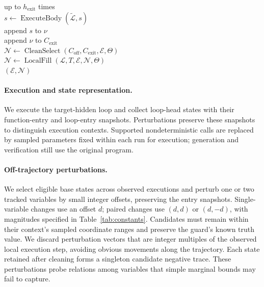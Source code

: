 \begin{algorithm}[H]
\begin{algorithmic}
\algline \algind {} up to \(h_{\mathrm{exit}}\) times\\
\algline \algind \algind \(s\leftarrow\operatorname{ExecuteBody}(\widetilde{\mathcal L},s)\)
  \\
\algline \algind \algind append \(s\) to \(\nu\)\\
\algline \algind append \(\nu\) to \(C_{\mathrm{exit}}\)
  \\
\algline \(\mathcal N\leftarrow\operatorname{CleanSelect}(C_{\mathrm{off}},C_{\mathrm{exit}},\mathcal E,\Theta)\)\\
\algline \(\mathcal N\leftarrow\operatorname{LocalFill}(\mathcal L,T,\mathcal E,\mathcal N,\Theta)\)
  \\
\algline {} \((\mathcal E,\mathcal N)\)
\end{algorithmic}
\end{algorithm}

\paragraph{Execution and state representation.}
We execute the target-hidden loop and collect loop-head states with their
function-entry and loop-entry snapshots.  Perturbations preserve these
snapshots to distinguish execution contexts.  Supported nondeterministic
calls are replaced by sampled parameters fixed within each run for execution;
generation and verification still use the original program.

\paragraph{Off-trajectory perturbations.}
We select eligible base states across observed executions and perturb one or
two tracked variables by small integer offsets, preserving the entry snapshots.
Single-variable changes use an offset \(d\); paired changes use \((d,d)\) or
\((d,-d)\), with magnitudes specified in Table~\ref{tab:constants}.
Candidates must remain within their context's sampled coordinate ranges and
preserve the guard's known truth value.  We discard perturbation vectors that
are integer multiples of the observed local execution step, avoiding obvious
movements along the trajectory.  Each state retained after cleaning forms a
singleton candidate negative trace.  These perturbations probe relations
among variables that simple marginal bounds may fail to capture.

